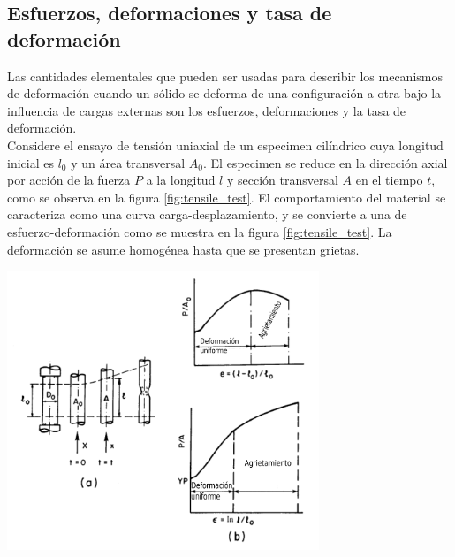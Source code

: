 \subsection{Esfuerzos, deformaciones y tasa de deformación}

Las cantidades elementales que pueden ser usadas para describir los mecanismos de deformación 
cuando un sólido se deforma de una configuración a otra bajo la influencia de cargas externas 
son los esfuerzos, deformaciones y la tasa de deformación. ~\cite{kobayashi1989} \\

Considere el ensayo de tensión uniaxial de un especimen cilíndrico cuya longitud inicial 
es $l_0$ y un área transversal $A_0$. El especimen se reduce en la dirección axial 
por acción de la fuerza $P$ a la longitud $l$ y sección transversal $A$ en el tiempo 
$t$, como se observa en la figura \ref{fig:tensile_test}. El comportamiento del material 
se caracteriza como una curva carga-desplazamiento, y se convierte a una de 
esfuerzo-deformación como se muestra en la figura \ref{fig:tensile_test}. La deformación 
se asume homogénea hasta que se presentan grietas. ~\cite{kobayashi1989} \\

\begin{center}
\includegraphics[width=0.7\textwidth]{src/ch2/tensile_test.pdf}
\label{fig:tensile_test}
\end{center}

